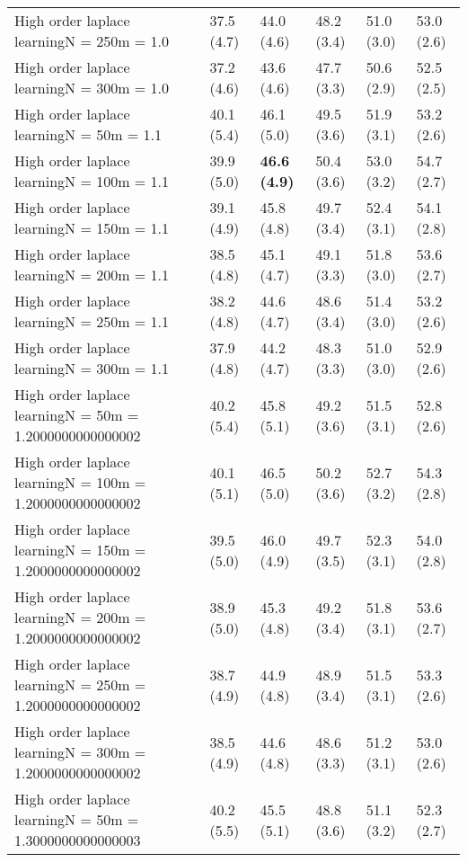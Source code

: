 \documentclass{article}
\begin{document}
\begin{table*}[t!]
\begin{center}
\begin{small}
\begin{sc}
\begin{tabular}{llllll}
High order laplace learningN = 250m = 1.0&37.5 (4.7)      &44.0 (4.6)      &48.2 (3.4)      &51.0 (3.0)      &53.0 (2.6)      \\
High order laplace learningN = 300m = 1.0&37.2 (4.6)      &43.6 (4.6)      &47.7 (3.3)      &50.6 (2.9)      &52.5 (2.5)      \\
High order laplace learningN = 50m = 1.1&40.1 (5.4)      &46.1 (5.0)      &49.5 (3.6)      &51.9 (3.1)      &53.2 (2.6)      \\
High order laplace learningN = 100m = 1.1&39.9 (5.0)      &{\bf 46.6 (4.9)}&50.4 (3.6)      &53.0 (3.2)      &54.7 (2.7)      \\
High order laplace learningN = 150m = 1.1&39.1 (4.9)      &45.8 (4.8)      &49.7 (3.4)      &52.4 (3.1)      &54.1 (2.8)      \\
High order laplace learningN = 200m = 1.1&38.5 (4.8)      &45.1 (4.7)      &49.1 (3.3)      &51.8 (3.0)      &53.6 (2.7)      \\
High order laplace learningN = 250m = 1.1&38.2 (4.8)      &44.6 (4.7)      &48.6 (3.4)      &51.4 (3.0)      &53.2 (2.6)      \\
High order laplace learningN = 300m = 1.1&37.9 (4.8)      &44.2 (4.7)      &48.3 (3.3)      &51.0 (3.0)      &52.9 (2.6)      \\
High order laplace learningN = 50m = 1.2000000000000002&40.2 (5.4)      &45.8 (5.1)      &49.2 (3.6)      &51.5 (3.1)      &52.8 (2.6)      \\
High order laplace learningN = 100m = 1.2000000000000002&40.1 (5.1)      &46.5 (5.0)      &50.2 (3.6)      &52.7 (3.2)      &54.3 (2.8)      \\
High order laplace learningN = 150m = 1.2000000000000002&39.5 (5.0)      &46.0 (4.9)      &49.7 (3.5)      &52.3 (3.1)      &54.0 (2.8)      \\
High order laplace learningN = 200m = 1.2000000000000002&38.9 (5.0)      &45.3 (4.8)      &49.2 (3.4)      &51.8 (3.1)      &53.6 (2.7)      \\
High order laplace learningN = 250m = 1.2000000000000002&38.7 (4.9)      &44.9 (4.8)      &48.9 (3.4)      &51.5 (3.1)      &53.3 (2.6)      \\
High order laplace learningN = 300m = 1.2000000000000002&38.5 (4.9)      &44.6 (4.8)      &48.6 (3.3)      &51.2 (3.1)      &53.0 (2.6)      \\
High order laplace learningN = 50m = 1.3000000000000003&40.2 (5.5)      &45.5 (5.1)      &48.8 (3.6)      &51.1 (3.2)      &52.3 (2.7)      \\

\end{tabular}
\end{sc}
\end{small}
\end{center}
\end{table*}
\end{document}
